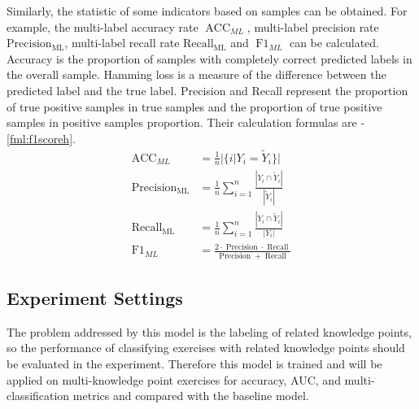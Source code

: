 Similarly, the statistic of some indicators based on samples can be obtained. For example, the multi-label accuracy rate \(\operatorname{ACC}_{ML}\), multi-label precision rate \(\operatorname{Precision_{ML}}\), multi-label recall rate \(\operatorname{Recall_{ML}}\) and \(\operatorname{F1}_{ML}\) can be calculated. Accuracy is the proportion of samples with completely correct predicted labels in the overall sample. Hamming loss is a measure of the difference between the predicted label and the true label. Precision and Recall represent the proportion of true positive samples in true samples and the proportion of true positive samples in positive samples proportion. Their calculation formulas are \eqname{\ref{fml:subaccuracy}}-{\ref{fml:f1scoreh}}.
\begin{align}
    \operatorname{ACC}_{ML}       & =\frac{1}{n} |\{i|Y_i=\tilde{Y}_i\}| \label{fml:subaccuracy}                                                                              \\
    \operatorname{Precision_{ML}} & =\frac{1}{n} \sum_{i=1}^{n} \frac{|Y_{i} \cap \tilde{Y}_i|}{|\tilde{Y}_i|} \label{fml:Precisionh}                                         \\
    \operatorname{Recall_{ML}}    & =\frac{1}{n} \sum_{i=1}^{n} \frac{|Y_{i} \cap \tilde{Y}_i|}{|Y_{i}|}    \label{fml:Recallh}                                               \\
    \operatorname{F1}_{ML}        & =\frac{2 \cdot \operatorname{Precision} \cdot \operatorname{Recall}}{\operatorname{Precision}+\operatorname{Recall}} \label{fml:f1scoreh}
\end{align}

\subsection{Experiment Settings}
The problem addressed by this model is the labeling of related knowledge points, so the performance of classifying exercises with related knowledge points should be evaluated in the experiment. Therefore this model is trained and will be applied on multi-knowledge point exercises for accuracy, AUC, and multi-classification metrics and compared with the baseline model.

